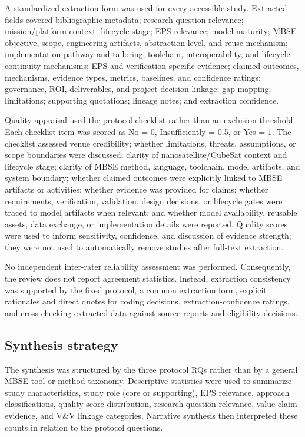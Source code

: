 A standardized extraction form was used for every accessible study.  Extracted fields covered bibliographic metadata; research-question relevance; mission/platform context; lifecycle stage; EPS relevance; model maturity; MBSE objective, scope, engineering artifacts, abstraction level, and reuse mechanism; implementation pathway and tailoring; toolchain, interoperability, and lifecycle-continuity mechanisms; EPS and verification-specific evidence; claimed outcomes, mechanisms, evidence types, metrics, baselines, and confidence ratings; governance, ROI, deliverables, and project-decision linkage; gap mapping; limitations; supporting quotations; lineage notes; and extraction confidence.

Quality appraisal used the protocol checklist rather than an exclusion threshold.  Each checklist item was scored as No = 0, Insufficiently = 0.5, or Yes = 1.  The checklist assessed venue credibility; whether limitations, threats, assumptions, or scope boundaries were discussed; clarity of nanosatellite/CubeSat context and lifecycle stage; clarity of MBSE method, language, toolchain, model artifacts, and system boundary; whether claimed outcomes were explicitly linked to MBSE artifacts or activities; whether evidence was provided for claims; whether requirements, verification, validation, design decisions, or lifecycle gates were traced to model artifacts when relevant; and whether model availability, reusable assets, data exchange, or implementation details were reported.  Quality scores were used to inform sensitivity, confidence, and discussion of evidence strength; they were not used to automatically remove studies after full-text extraction.

No independent inter-rater reliability assessment was performed.  Consequently, the review does not report agreement statistics.  Instead, extraction consistency was supported by the fixed protocol, a common extraction form, explicit rationales and direct quotes for coding decisions, extraction-confidence ratings, and cross-checking extracted data against source reports and eligibility decisions.

\subsection{Synthesis strategy}
The synthesis was structured by the three protocol RQs rather than by a general MBSE tool or method taxonomy.  Descriptive statistics were used to summarize study characteristics, study role (core or supporting), EPS relevance, approach classifications, quality-score distribution, research-question relevance, value-claim evidence, and V\&V linkage categories.  Narrative synthesis then interpreted these counts in relation to the protocol questions.

